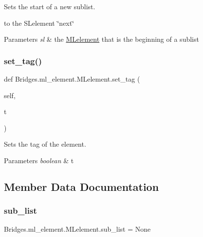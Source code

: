Sets the start of a new sublist. 

to the S\+Lelement \char`\"{}next\char`\"{}


\begin{DoxyParams}{Parameters}
{\em sl} & the \mbox{\hyperlink{class_bridges_1_1ml__element_1_1_m_lelement}{M\+Lelement}} that is the beginning of a sublist \\
\hline
\end{DoxyParams}
\mbox{\label{class_bridges_1_1ml__element_1_1_m_lelement_a5f093a6896365033a3a658a81b0024fe}} 
\subsubsection{\texorpdfstring{set\+\_\+tag()}{set\_tag()}}
{\footnotesize\ttfamily def Bridges.\+ml\+\_\+element.\+M\+Lelement.\+set\+\_\+tag (\begin{DoxyParamCaption}\item[{}]{self,  }\item[{}]{t }\end{DoxyParamCaption})}



Sets the tag of the element. 


\begin{DoxyParams}{Parameters}
{\em boolean} & t \\
\hline
\end{DoxyParams}


\subsection{Member Data Documentation}
\mbox{\label{class_bridges_1_1ml__element_1_1_m_lelement_a08b50da0d31100920122df7df01c8abc}} 
\subsubsection{\texorpdfstring{sub\+\_\+list}{sub\_list}}
{\footnotesize\ttfamily Bridges.\+ml\+\_\+element.\+M\+Lelement.\+sub\+\_\+list = None\hspace{0.3cm}{\ttfamily [static]}}

